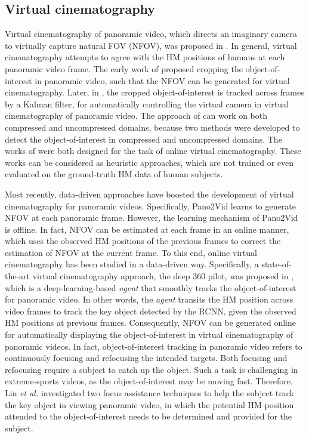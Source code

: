 \documentclass[10pt,journal,compsoc]{IEEEtran}
\begin{document}
\subsection{Virtual cinematography}
Virtual cinematography of panoramic video, which directs an imaginary camera to virtually capture natural FOV (NFOV), was proposed in \cite{foote2000flycam, sun2005region, su2016pano2vid, hu2017deep, lin2017tell}. In general, virtual cinematography attempts to agree with the HM positions of humans at each panoramic video frame. The early work of \cite{foote2000flycam} proposed cropping the object-of-interest in panoramic video, such that the NFOV can be generated for virtual cinematography. Later, in \cite{sun2005region}, the cropped object-of-interest is tracked across frames by a Kalman filter, for automatically controlling the virtual camera in virtual cinematography of panoramic video. The approach of \cite{sun2005region} can work on both compressed and uncompressed domains, because two methods were developed to detect the object-of-interest in compressed and uncompressed domains. The works of \cite{foote2000flycam, sun2005region} were both designed for the task of online virtual cinematography. These works can be considered as heuristic approaches, which are not trained or even evaluated on the ground-truth HM data of human subjects.

Most recently, data-driven approaches have boosted the development of virtual cinematography for panoramic videos. Specifically, Pano2Vid \cite{su2016pano2vid} learns to generate NFOV at each panoramic frame. However, the learning mechanism of Pano2Vid is offline. In fact, NFOV can be estimated at each frame in an online manner, which uses the observed HM positions of the previous frames to correct the estimation of NFOV at the current frame. To this end, online virtual cinematography \cite{hu2017deep, lin2017tell} has been studied in a data-driven way.
Specifically, a state-of-the-art virtual cinematography  approach, the deep 360 pilot,  was proposed in \cite{hu2017deep}, which is a deep-learning-based \textit{agent} that smoothly tracks the object-of-interest for panoramic video. In other words, the \textit{agent} transits the HM position across video frames to track the key object detected by the RCNN, given the observed HM positions at previous frames. Consequently, NFOV can be generated online for automatically displaying the object-of-interest in virtual cinematography of panoramic videos. In fact, object-of-interest tracking in panoramic video refers to continuously focusing and refocusing the intended targets. Both focusing and refocusing require a subject to catch up the object. Such a task is challenging in extreme-sports videos, as the object-of-interest may be moving fast. Therefore, Lin \textit{et al.} \cite{lin2017tell} investigated two focus assistance techniques to help the subject track the key object in viewing panoramic video, in which the potential HM position attended to the object-of-interest needs to be determined and provided for the subject.
\end{document}
